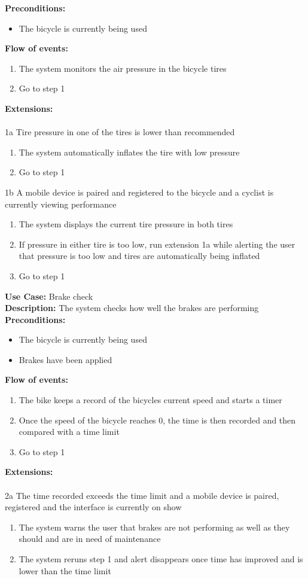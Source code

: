 \documentclass[a4paper]{report}
\begin{document}
\textbf{Preconditions:} \begin{itemize}
\item The bicycle is currently being used
\end{itemize}
\textbf{Flow of events:} \begin{enumerate}
\item The system monitors the air pressure in the bicycle tires
\item Go to step 1
\end{enumerate}
\textbf{Extensions:} \\\\
1a Tire pressure in one of the tires is lower than recommended
\begin{enumerate}
\item The system automatically inflates the tire with low pressure
\item Go to step 1
\end{enumerate}
1b A mobile device is paired and registered to the bicycle and a cyclist is currently viewing performance
\begin{enumerate}
\item The system displays the current tire pressure in both tires
\item If pressure in either tire is too low, run extension 1a while alerting the user that pressure is too low and tires are automatically being inflated
\item Go to step 1
\end{enumerate}
\textbf{Use Case:} Brake check\\
\textbf{Description:} The system checks how well the brakes are performing \\
\textbf{Preconditions:} \begin{itemize}
\item The bicycle is currently being used
\item Brakes have been applied
\end{itemize}
\textbf{Flow of events:} \begin{enumerate}
\item The bike keeps a record of the bicycles current speed and starts a timer
\item Once the speed of the bicycle reaches 0, the time is then recorded and then compared with a time limit
\item Go to step 1
\end{enumerate}
\textbf{Extensions:} \\\\
2a The time recorded exceeds the time limit and a mobile device is paired, registered and the interface is currently on show
\begin{enumerate}
\item The system warns the user that brakes are not performing as well as they should and are in need of maintenance
\item The system reruns step 1 and alert disappears once time has improved and is lower than the time limit
\end{enumerate}
\end{document}
